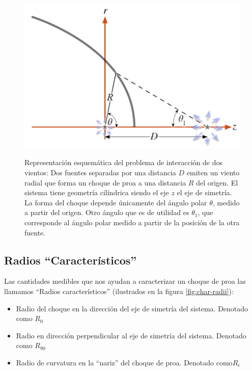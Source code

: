 \begin{figure}
  \includegraphics[width=0.5\linewidth]{./Figures/bowshock-crw-variables}
  \label{fig:crw-esquema}
  \caption{Representación esquemática del problema de interacción de dos vientos:
    Dos fuentes separadas por una distancia $D$ emiten un viento radial que forma un
    choque de proa a una distancia $R$ del origen. El sistema tiene geometría cilíndrica
    siendo el eje $z$ el eje de simetría. La forma del choque depende únicamente del ángulo
    polar $\theta$, medido a partir del origen. Otro ángulo que es de utilidad es $\theta_1$,
  que corresponde al ángulo polar medido a partir de la posición de la otra fuente.}
\end{figure}

\subsection{Radios ``Característicos''}
\label{sec:char-rad}
Las cantidades medibles que nos ayudan a caracterizar un choque de proa las
llamamos ``Radios característicos'' (ilustrados en la figura
\ref{fig:char-radii}):
\begin{itemize}
\item Radio del choque en la dirección del eje de simetría del sistema.
  Denotado como $R_0$
\item Radio en dirección perpendicular al eje de simetría del sistema.
  Denotado como $R_{90}$
\item Radio de curvatura en la ``nariz'' del choque de proa. Denotado
  como$ R_c$
\end{itemize}

